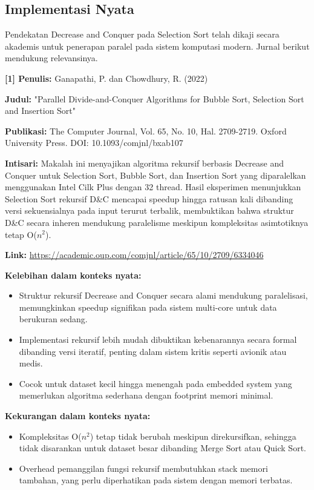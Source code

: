 \subsection{Implementasi Nyata}
Pendekatan Decrease and Conquer pada Selection Sort telah dikaji secara akademis untuk penerapan paralel pada sistem komputasi modern. Jurnal berikut mendukung relevansinya.

\vspace{1em}
\textbf{[1] Penulis:} Ganapathi, P. dan Chowdhury, R. (2022)

\textbf{Judul:} "Parallel Divide-and-Conquer Algorithms for Bubble Sort, Selection Sort and Insertion Sort"

\textbf{Publikasi:} The Computer Journal, Vol. 65, No. 10, Hal. 2709-2719. Oxford University Press. DOI: 10.1093/comjnl/bxab107

\textbf{Intisari:} Makalah ini menyajikan algoritma rekursif berbasis Decrease and Conquer untuk Selection Sort, Bubble Sort, dan Insertion Sort yang diparalelkan menggunakan Intel Cilk Plus dengan 32 thread. Hasil eksperimen menunjukkan Selection Sort rekursif D\&C mencapai speedup hingga ratusan kali dibanding versi sekuensialnya pada input terurut terbalik, membuktikan bahwa struktur D\&C secara inheren mendukung paralelisme meskipun kompleksitas asimtotiknya tetap O($n^2$).

\textbf{Link:} \url{https://academic.oup.com/comjnl/article/65/10/2709/6334046}

\vspace{1em}
\textbf{Kelebihan dalam konteks nyata:}
\begin{itemize}
    \item Struktur rekursif Decrease and Conquer secara alami mendukung paralelisasi, memungkinkan speedup signifikan pada sistem multi-core untuk data berukuran sedang.
    \item Implementasi rekursif lebih mudah dibuktikan kebenarannya secara formal dibanding versi iteratif, penting dalam sistem kritis seperti avionik atau medis.
    \item Cocok untuk dataset kecil hingga menengah pada embedded system yang memerlukan algoritma sederhana dengan footprint memori minimal.
\end{itemize}

\textbf{Kekurangan dalam konteks nyata:}
\begin{itemize}
    \item Kompleksitas O($n^2$) tetap tidak berubah meskipun direkursifkan, sehingga tidak disarankan untuk dataset besar dibanding Merge Sort atau Quick Sort.
    \item Overhead pemanggilan fungsi rekursif membutuhkan stack memori tambahan, yang perlu diperhatikan pada sistem dengan memori terbatas.
\end{itemize}